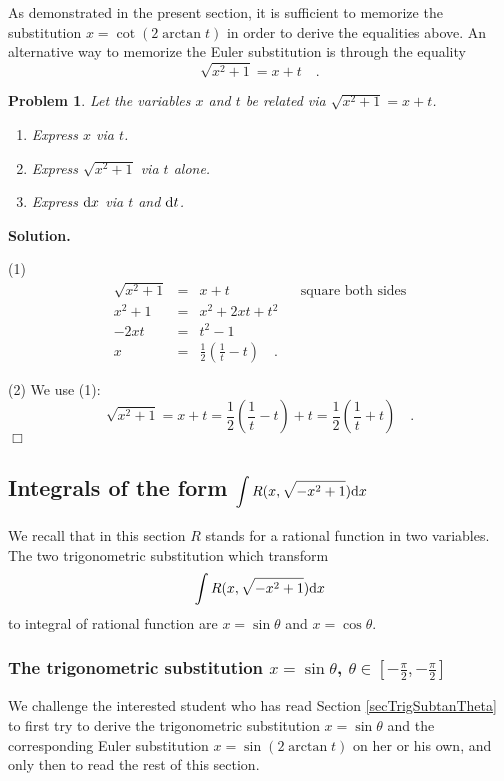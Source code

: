 \documentclass[12pt]{book}
\newenvironment{solution}{\medskip\noindent\textbf{Solution.} }{$\Box$}
\newtheorem{problem}[theorem]{Problem}
\begin{document}
As demonstrated in the present section, it is sufficient to memorize the substitution $x=\cot (2\arctan t)$ in order to derive the equalities above. An alternative way to memorize the Euler substitution is through the equality
\[
\sqrt{x^2+1}=x+t\quad .
\]
\begin{problem} Let the variables $x$ and $t$ be related via $\sqrt{x^2+1}=x+t$.
\begin{enumerate}
\item Express $x$ via $t$.
\item Express $\sqrt{x^2+1}$ via $t$ alone.
\item Express ${\normalfont \text{d}} x$ via $t$ and ${\normalfont \text{d}} t$.
\end{enumerate}
\end{problem}
\begin{solution}

\noindent(1)
\[
\begin{array}{rcll|l}
\sqrt{x^2+1}&=& x+t &&\text{square both sides}  \\
x^2+1&=&x^2+2xt+t^2\\
-2xt&=&t^2-1\\
x&=&\displaystyle\frac{1}{2}\left(\frac{1}{t}-t \right) \quad .
\end{array}
\]

\noindent(2) We use (1):
\[
\sqrt{x^2+1}= x+t = \frac{1}{2}\left(\frac{1}{t}-t \right)+t=\frac{1}{2}\left(\frac{1}{t}+t \right)\quad.
\]
\end{solution}
\subsection{Integrals of the form $\displaystyle \int R(x,\sqrt{-x^2+1}){\normalfont \text{d}} x$}
We recall that in this section $R$ stands for a rational function in two variables. The two trigonometric substitution which transform
\[
\int R(x, \sqrt{-x^2+1}){\normalfont \text{d}} x
\]
to integral of rational function are $x=\sin \theta$ and $x=\cos \theta$.

\subsubsection{The trigonometric substitution $x=\sin \theta$, $\theta \in \left[-\frac{\pi}{2},-\frac{\pi}{2} \right]$}
We challenge the interested student who has read Section \ref{secTrigSubtanTheta} to first try to derive the trigonometric substitution $x=\sin \theta$ and the corresponding Euler substitution $x=\sin (2\arctan t)$  on her or his own, and only then to read the rest of this section.
\end{document}
